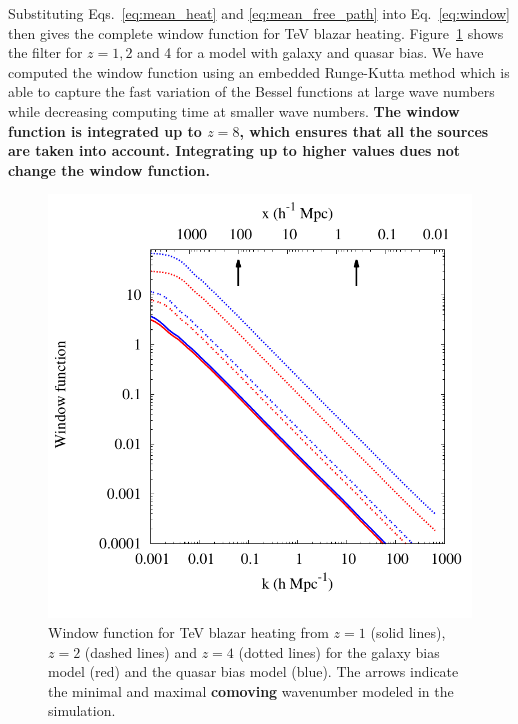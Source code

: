 \documentclass[numberedappendix]{emulateapj}
\newcommand\ALc[1]{{\color{red} \bf #1}} %
\begin{document}
Substituting Eqs.~\eqref{eq:mean_heat} and \eqref{eq:mean_free_path} into Eq.~\eqref{eq:window} then gives the complete window function for TeV blazar heating. Figure~\ref{fig:window} shows the filter for $z=1,2$ and 4 for a model with galaxy and quasar bias. We have computed the window function using an embedded Runge-Kutta method which is able to capture the fast variation of the Bessel functions at large wave numbers while decreasing computing time at smaller wave numbers. \ALc{The window function is integrated up to $z=8$, which ensures that all the sources are taken into account. Integrating up to higher values dues not change the window function.}

\begin{figure}[h]
\centering
 \includegraphics[width = .45\textwidth ]{window_gal_qso}

\caption{Window function for TeV blazar heating from $z=1$ (solid lines), $z=2$ (dashed lines) and $z=4$ (dotted lines) for the galaxy bias model (red) and the quasar bias model (blue).  The arrows indicate the minimal and maximal \ALc{comoving} wavenumber modeled in the simulation.}
\label{fig:window}
\end{figure}
\end{document}

